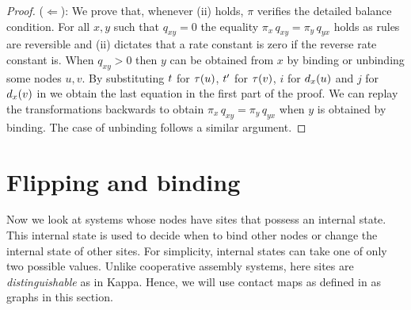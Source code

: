 \begin{proof}
  ($\Leftarrow$):
  We prove that, whenever (ii) holds,
  $\pi$ verifies the detailed balance condition.
  For all $x,y$ such that $q_{xy} = 0$
  the equality $\pi_x\,q_{xy} = \pi_y\,q_{yx}$ holds
  as rules are reversible and (ii) dictates that
  a rate constant is zero if the reverse rate constant is.
  When $q_{xy} > 0$ then $y$ can be obtained from $x$
  by binding or unbinding some nodes $u,v$.
  By substituting $t$ for $\tau(u)$, $t'$ for $\tau(v)$,
  $i$ for $d_x(u)$ and $j$ for $d_x(v)$
  in  we obtain the last equation
  in the first part of the proof.
  We can replay the transformations backwards
  to obtain $\pi_x\,q_{xy} = \pi_y\,q_{yx}$
  when $y$ is obtained by binding.
  The case of unbinding follows a similar argument.
\end{proof}


\section{Flipping and binding} %
\label{sec:fb}

Now we look at systems whose nodes have sites
that possess an internal state.
This internal state is used to decide when to bind other nodes
or change the internal state of other sites.
For simplicity, internal states can
take one of only two possible values. %
Unlike cooperative assembly systems,
here sites are \emph{distinguishable}
as in Kappa.
Hence, we will use contact maps as defined in 
as graphs in this section.

